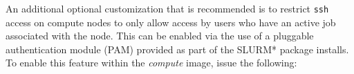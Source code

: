 An additional optional customization that is recommended is to
restrict \texttt{ssh} access on compute nodes to only allow access by users who
have an active job associated with the node. This can be enabled via the use of
a pluggable authentication module (PAM) provided as part of the SLURM* package
installs. To enable this feature within the {\em compute} image, issue the following:


